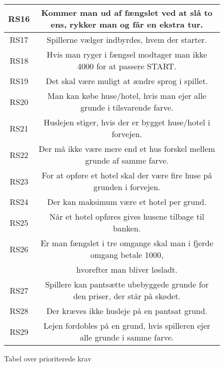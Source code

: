 \begin{figure}[H]
\begin{tabular}{ | c | c | }
\hline
RS16 & Kommer man ud af fængslet ved at slå to ens, rykker man og får en ekstra tur. \\ 
\hline
RS17 & Spillerne vælger indbyrdes, hvem der starter. \\ 
\hline
RS18 & Hvis man ryger i fængsel modtager man ikke 4000 for at passere START. \\
\hline
RS19 & Det skal være muligt at ændre sprog i spillet. \\ 
\hline
RS20 & Man kan købe huse/hotel, hvis man ejer alle grunde i tilsvarende farve. \\ 
\hline
RS21 & Huslejen stiger, hvis der er bygget huse/hotel i forvejen. \\ 
\hline
RS22 & Der må ikke være mere end et hus forskel mellem grunde af samme farve. \\ 
\hline
RS23 & For at opføre et hotel skal der være fire huse på grunden i forvejen. \\ 
\hline
RS24 & Der kan maksimum være et hotel per grund.\\ 
\hline
RS25 & Når et hotel opføres gives husene tilbage til banken. \\ 
\hline
RS26 & Er man fængslet i tre omgange skal man i fjerde omgang betale 1000, \\
& hvorefter man bliver løsladt.\\
\hline
RS27 & Spillere kan pantsætte ubebyggede grunde for den priser, der står på skødet.\\
\hline
RS28 & Der kræves ikke husleje på en pantsat grund.\\
\hline
RS29 & Lejen fordobles på en grund, hvis spilleren ejer alle grunde i samme farve.\\
\hline
\end{tabular}
\caption{Tabel over prioriterede krav}
\end{figure}
